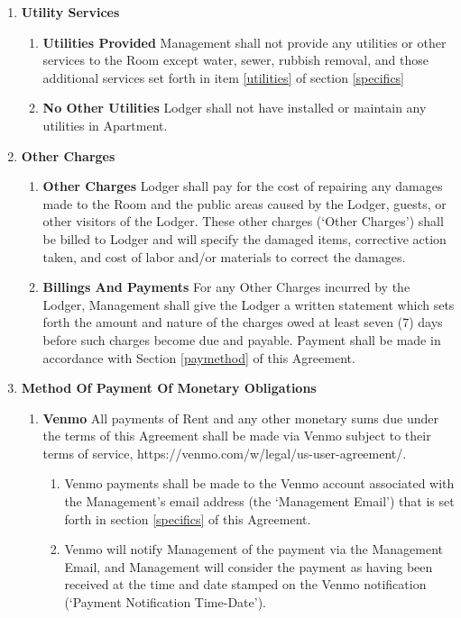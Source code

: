 \documentclass[12pt,letterpaper]{article}
\newcommand{\management}{Management}
\newcommand{\myemail}{Management Email}
\newcommand{\apt}{Apartment}
\newcommand{\room}{Room}
\newcommand{\lodger}{Lodger}
\newcommand{\paymenttime}{Payment Notification Time-Date}
\begin{document}
\begin{enumerate}
\begin{enumerate}
		\end{enumerate} 
	\item \textbf{Utility Services} \quad 
		\begin{enumerate} 
			\item \textbf{Utilities Provided} \quad \management{} shall not provide any utilities or other services to the \room{} except water, sewer, rubbish removal, and those additional services set forth in item \ref{utilities} of section \ref{specifics}
			\item \textbf{No Other Utilities} \quad \lodger{} shall not have installed or maintain any utilities in \apt{}.
		\end{enumerate} 
	\item \textbf{Other Charges} \quad 
		\begin{enumerate} 
			\item \textbf{Other Charges} \quad \lodger{} shall pay for the cost of repairing any damages made to the \room{} and the public areas caused by the \lodger{}, guests, or other visitors of the \lodger{}. These other charges (`Other Charges') shall be billed to \lodger{} and will specify the damaged items, corrective action taken, and cost of labor and/or materials to correct the damages. 
			\item \textbf{Billings And Payments} \quad For any Other Charges incurred by the \lodger{}, \management{} shall give the \lodger{} a written statement which sets forth the amount and nature of the charges owed at least seven (7) days before such charges become due and payable. Payment shall be made in accordance with Section \ref{paymethod} of this Agreement. 
		\end{enumerate} 
	\item \textbf{Method Of Payment Of Monetary Obligations} \quad \label{paymethod}
		\begin{enumerate} 
			\item \textbf{Venmo} \quad All payments of Rent and any other monetary sums due under the terms of this Agreement shall be made via Venmo subject to their terms of service, https://venmo.com/w/legal/us-user-agreement/. 
				\begin{enumerate}
					\item Venmo payments shall be made to the Venmo account associated with the \management{}'s email address (the `\myemail{}') that is set forth in section \ref{specifics} of this Agreement{}. 
					\item \label{defpaytime} 
						Venmo will notify \management{} of the payment via the \myemail{}, and \management{} will consider the payment as having been received at the time and date stamped on the Venmo notification (`\paymenttime{}'). 

\end{enumerate}
\end{enumerate}
\end{enumerate}
\end{document}
